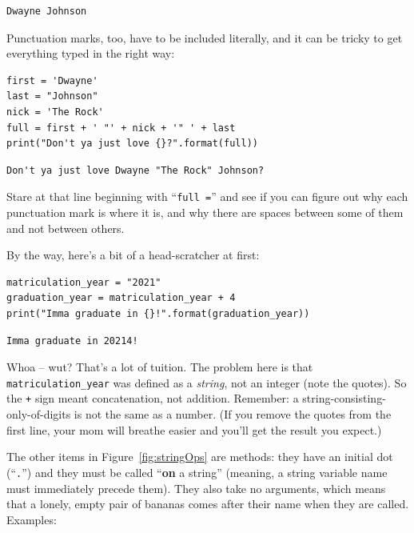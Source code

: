 \begin{Verbatim}[fontsize=\small,samepage=true,frame=leftline,framesep=5mm,framerule=1mm]
Dwayne Johnson
\end{Verbatim}

Punctuation marks, too, have to be included literally, and it can be tricky to
get everything typed in the right way:

\begin{Verbatim}[fontsize=\small,samepage=true,frame=single,framesep=3mm]
first = 'Dwayne'
last = "Johnson"
nick = 'The Rock'
full = first + ' "' + nick + '" ' + last
print("Don't ya just love {}?".format(full))
\end{Verbatim}

\begin{Verbatim}[fontsize=\small,samepage=true,frame=leftline,framesep=5mm,framerule=1mm]
Don't ya just love Dwayne "The Rock" Johnson?
\end{Verbatim}

Stare at that line beginning with ``\texttt{full =}'' and see if you can figure
out why each punctuation mark is where it is, and why there are spaces between
some of them and not between others.

By the way, here's a bit of a head-scratcher at first:

\begin{Verbatim}[fontsize=\small,samepage=true,frame=single,framesep=3mm]
matriculation_year = "2021"
graduation_year = matriculation_year + 4
print("Imma graduate in {}!".format(graduation_year))
\end{Verbatim}

\begin{Verbatim}[fontsize=\small,samepage=true,frame=leftline,framesep=5mm,framerule=1mm]
Imma graduate in 20214!
\end{Verbatim}

Whoa -- wut? That's a lot of tuition. The problem here is that
\texttt{matriculation\_year} was defined as a \textit{string}, not an integer
(note the quotes). So the \texttt{+} sign meant concatenation, not addition.
Remember: a string-consisting-only-of-digits is not the same as a number. (If
you remove the quotes from the first line, your mom will breathe easier and
you'll get the result you expect.)

The other items in Figure~\ref{fig:stringOps} are methods: they have an initial
dot (``\texttt{.}'') and they must be called ``\textbf{on} a string'' (meaning,
a string variable name must immediately precede them). They also take no
arguments, which means that a lonely, empty pair of bananas comes after their
name when they are called. Examples:

